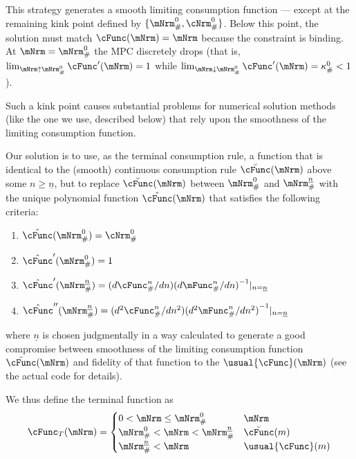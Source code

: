 \documentclass[\econtexRoot/BufferStockTheory]{subfiles}
\begin{document}
This strategy generates a smooth limiting consumption function ---
except at the remaining kink point defined by
$\{\mNrm_{\#}^{0},\cNrm_{\#}^{0}\}$.  Below this point, the solution
must match $\cFunc(\mNrm)=\mNrm$ because the constraint is binding.
At $\mNrm=\mNrm_{\#}^{0}$ the MPC discretely drops (that is,
$\lim_{\mNrm \uparrow \mNrm^{0}_{\#}} \cFunc^{\prime}(\mNrm)= 1$ while
$\lim_{\mNrm \downarrow \mNrm^{0}_{\#}}\cFunc^{\prime}(\mNrm) =
\kappa_{\#}^{0} < 1$).

Such a kink point causes substantial problems for numerical solution methods (like the one we use, described below) that rely upon the smoothness of the limiting consumption function.

Our solution is to use, as the terminal consumption rule, a function
that is identical to the (smooth) continuous consumption rule
$\breve{\cFunc}(\mNrm)$ above some $n \geq \underline{n}$, but to
replace $\breve{\cFunc}(\mNrm)$ between $\mNrm_{\#}^{0}$ and
$\mNrm_{\#}^{\underline{n}}$ with the unique polynomial function
$\hat{\cFunc}(\mNrm)$ that satisfies the following criteria:
\begin{enumerate}
\item $\hat{\cFunc}(\mNrm_{\#}^{0})  = \cNrm_{\#}^{0}$
\item $\hat{\cFunc}^{\prime}(\mNrm_{\#}^{0}) = 1$
\item $\hat{\cFunc}^{\prime}(\mNrm_{\#}^{\underline{n}}) = {(d \cFunc_{\#}^{n}/d n)(d \mFunc_{\#}^{n}/d n)}^{-1}|_{n=\underline{n}}$
\item $\hat{\cFunc}^{\prime\prime}(\mNrm_{\#}^{\underline{n}}) = {(d^{2} \cFunc_{\#}^{n}/d n^{2})(d^{2} \mFunc_{\#}^{n}/d n^{2})}^{-1}|_{n=\underline{n}}$
\end{enumerate}
where $\underline{n}$ is chosen judgmentally in a way calculated to
generate a good compromise between smoothness of the limiting
consumption function $\breve{\cFunc}(\mNrm)$ and fidelity of that
function to the $\usual{\cFunc}(\mNrm)$ (see the actual code for
details).

We thus define the terminal function as
\begin{equation}
\cFunc_{T}(\mNrm) =
\begin{cases}
 0 < \mNrm \leq \mNrm_{\#}^{0} & \mNrm \\
 \mNrm_{\#}^{0} < \mNrm < \mNrm_{\#}^{\underline{n}}      & \breve{\cFunc}(m) \\
 \mNrm_{\#}^{\underline{n}} < \mNrm  & \usual{\cFunc}(m)
\end{cases}
\end{equation}
\end{document}

